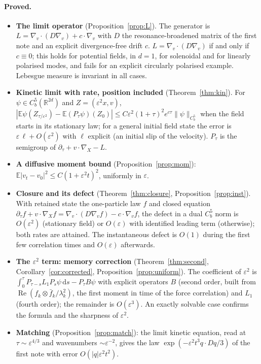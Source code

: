 \documentclass[11pt]{article}
\newcommand{\dd}{\mathrm{d}}
\newcommand{\E}{\mathbb{E}}
\newcommand{\eps}{\varepsilon}
\newcommand{\R}{\mathbb{R}}
\renewcommand{\Re}{\operatorname{Re}}
\newcommand{\nrm}[2]{\|#1\|_{#2}}
\theoremstyle{remark}
\begin{document}
\paragraph{Proved.}
\begin{itemize}
  \item \textbf{The limit operator} (Proposition~\ref{prop:L}). The
    generator is $L=\nabla_v\cdot(D\nabla_v)+c\cdot\nabla_v$ with $D$ the
    resonance-broadened matrix of the first note and an explicit
    divergence-free drift $c$. $L=\nabla_v\cdot(D\nabla_v)$ if and only if
    $c\equiv0$; this holds for potential fields, in $d=1$, for solenoidal
    and for linearly polarised modes, and fails for an explicit circularly
    polarised example. Lebesgue measure is invariant in all cases.
  \item \textbf{Kinetic limit with rate, position included}
    (Theorem~\ref{thm:kin}). For $\psi\in C_b^5(\R^{2d})$ and
    $Z=(\eps^2x,v)$, $|\E\psi(Z_{\tau/\eps^2})-\E(P_\tau\psi)(Z_0)|\le
    C\eps^2(1+\tau)^2e^{c\tau}\nrm{\psi}{C_b^5}$ when the field starts in its
    stationary law; for a general initial field state the error is
    $\eps\,\ell+O(\eps^2)$ with $\ell$ explicit (an initial slip of the
    velocity). $P_\tau$ is the semigroup of
    $\partial_\tau+v\cdot\nabla_X-L$.
  \item \textbf{A diffusive moment bound} (Proposition~\ref{prop:mom}):
    $\E|v_t-v_0|^2\le C(1+\eps^2t)^2$, uniformly in $\eps$.
  \item \textbf{Closure and its defect} (Theorem~\ref{thm:closure},
    Proposition~\ref{prop:inst}). With retained state the one-particle law
    $f$ and closed equation
    $\partial_\tau f+v\cdot\nabla_Xf=\nabla_v\cdot(D\nabla_vf)-c\cdot\nabla_vf$,
    the defect in a dual $C_b^5$ norm is $O(\eps^2)$ (stationary field) or
    $O(\eps)$ with identified leading term (otherwise); both rates are
    attained. The instantaneous defect is $O(1)$ during the first few
    correlation times and $O(\eps)$ afterwards.
  \item \textbf{The $\eps^2$ term: memory correction}
    (Theorem~\ref{thm:second}, Corollary~\ref{cor:corrected},
    Proposition~\ref{prop:uniform}). The coefficient of $\eps^2$ is
    $\int_0^\tau P_{\tau-s}L_1P_s\psi\,\dd s-P_\tau B\psi$ with explicit
    operators $B$ (second order, built from $\Re(f_k\otimes\bar
    f_k/\lambda_k^2)$, the first moment in time of the force correlation)
    and $L_1$ (fourth order); the remainder is $O(\eps^3)$. An exactly
    solvable case confirms the formula and the sharpness of $\eps^2$.
  \item \textbf{Matching} (Proposition~\ref{prop:match}): the limit kinetic
    equation, read at $\tau\sim\eps^{4/3}$ and wavenumbers $\sim\eps^{-2}$,
    gives the law $\exp(-\eps^2t^3q\cdot Dq/3)$ of the first note with error
    $O(|q|\eps^2t^2)$.
\end{itemize}
\end{document}
